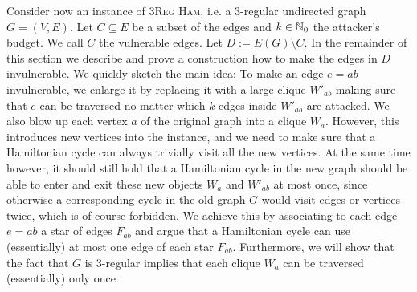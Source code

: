 Consider now an instance of \textsc{3Reg Ham}, i.e. a 3-regular undirected graph  $G = (V, E)$. Let $C \subseteq E$ be a subset of the edges and $k \in \mathbb{N}_0$ the attacker's budget. We call $C$ the vulnerable edges. Let $D := E(G) \setminus C$.
In the remainder of this section we describe and prove a construction how to make the edges in $D$ invulnerable.
We quickly sketch the main idea: To make an edge $e = ab$ invulnerable, we enlarge it by replacing it with a large clique $W'_{ab}$ making sure that $e$ can be traversed no matter which $k$ edges inside $W'_{ab}$  are attacked. 
We also blow up each vertex $a$ of the original graph into a clique $W_a$.
However, this introduces new vertices into the instance, and we need to make sure that a Hamiltonian cycle can always trivially visit all the new vertices.
At the same time however, it should still hold that a Hamiltonian cycle in the new graph should be able to enter and exit these new objects $W_a$ and $W'_{ab}$ at most once, since otherwise a corresponding cycle in the old graph $G$ would visit edges or vertices twice, which is of course forbidden.
We achieve this by associating to each edge $e = ab$ a star of edges $F_{ab}$ and argue that a Hamiltonian cycle can use (essentially) at most one edge of each star $F_{ab}$. 
Furthermore, we will show that the fact that $G$ is 3-regular implies that each clique $W_a$ can be traversed (essentially) only once.

